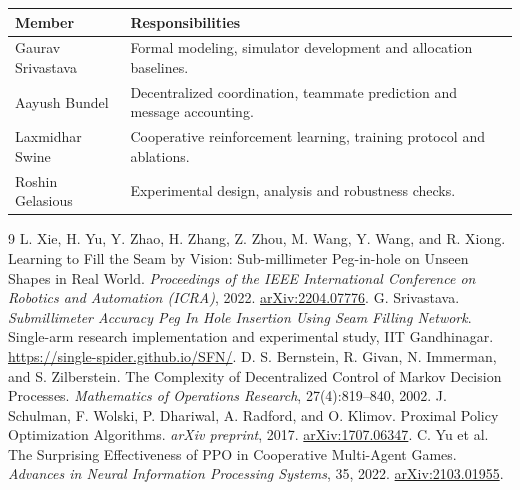 \documentclass{article}
\begin{document}
\begin{table}[!ht]\centering
\begin{tabularx}{\linewidth}{@{}p{.24\linewidth}X@{}}\toprule
Member & Responsibilities \\\midrule
Gaurav Srivastava & Formal modeling, simulator development and allocation baselines. \\
Aayush Bundel & Decentralized coordination, teammate prediction and message accounting. \\
Laxmidhar Swine & Cooperative reinforcement learning, training protocol and ablations. \\
Roshin Gelasious & Experimental design, analysis and robustness checks. \\
\bottomrule\end{tabularx}
\end{table}

\begin{thebibliography}{9}
 L. Xie, H. Yu, Y. Zhao, H. Zhang, Z. Zhou, M. Wang, Y. Wang, and R. Xiong. Learning to Fill the Seam by Vision: Sub-millimeter Peg-in-hole on Unseen Shapes in Real World. \emph{Proceedings of the IEEE International Conference on Robotics and Automation (ICRA)}, 2022. \href{https://arxiv.org/abs/2204.07776}{arXiv:2204.07776}.
 G. Srivastava. \emph{Submillimeter Accuracy Peg In Hole Insertion Using Seam Filling Network}. Single-arm research implementation and experimental study, IIT Gandhinagar. \url{https://single-spider.github.io/SFN/}.
 D. S. Bernstein, R. Givan, N. Immerman, and S. Zilberstein. The Complexity of Decentralized Control of Markov Decision Processes. \emph{Mathematics of Operations Research}, 27(4):819--840, 2002.
 J. Schulman, F. Wolski, P. Dhariwal, A. Radford, and O. Klimov. Proximal Policy Optimization Algorithms. \emph{arXiv preprint}, 2017. \href{https://arxiv.org/abs/1707.06347}{arXiv:1707.06347}.
 C. Yu et al. The Surprising Effectiveness of PPO in Cooperative Multi-Agent Games. \emph{Advances in Neural Information Processing Systems}, 35, 2022. \href{https://arxiv.org/abs/2103.01955}{arXiv:2103.01955}.
\end{thebibliography}
\end{document}
